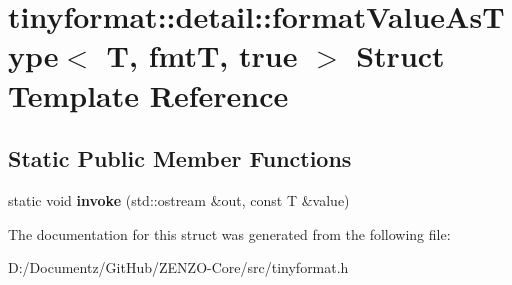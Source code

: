 \hypertarget{structtinyformat_1_1detail_1_1format_value_as_type_3_01_t_00_01fmt_t_00_01true_01_4}{}\section{tinyformat\+::detail\+::format\+Value\+As\+Type$<$ T, fmtT, true $>$ Struct Template Reference}
\label{structtinyformat_1_1detail_1_1format_value_as_type_3_01_t_00_01fmt_t_00_01true_01_4}
\subsection*{Static Public Member Functions}
\begin{DoxyCompactItemize}
\item 
\mbox{\label{structtinyformat_1_1detail_1_1format_value_as_type_3_01_t_00_01fmt_t_00_01true_01_4_a7680bc0f7b6b5eee0e27c494812fb667}} 
static void {\bfseries invoke} (std\+::ostream \&out, const T \&value)
\end{DoxyCompactItemize}


The documentation for this struct was generated from the following file\+:\begin{DoxyCompactItemize}
\item 
D\+:/\+Documentz/\+Git\+Hub/\+Z\+E\+N\+Z\+O-\/\+Core/src/tinyformat.\+h\end{DoxyCompactItemize}
